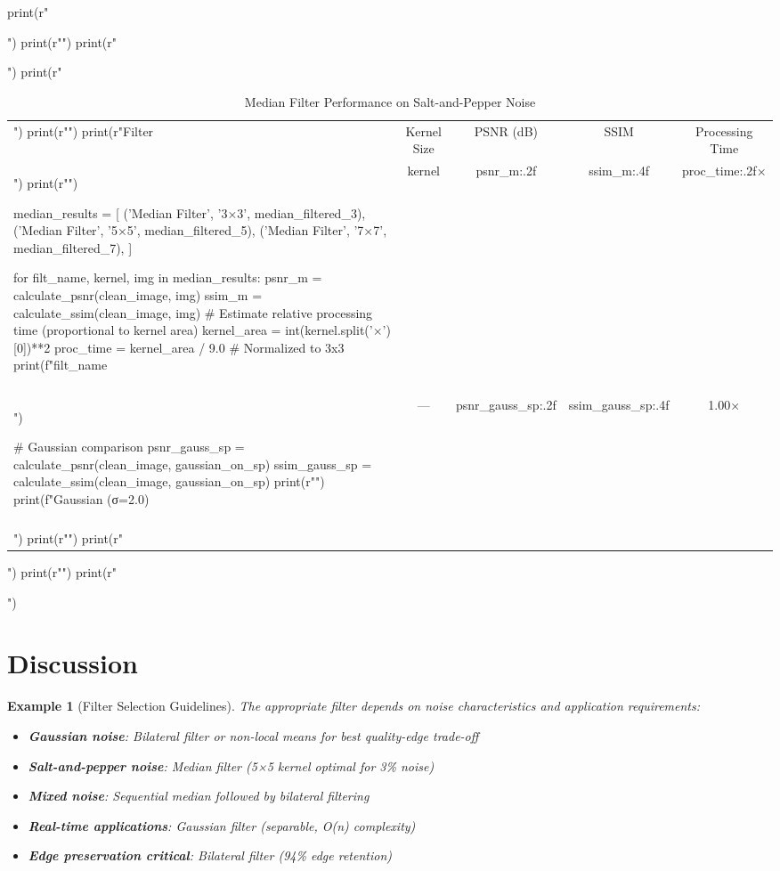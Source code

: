 \documentclass[a4paper, 11pt]{article}
\newtheorem{example}{Example}[section]
\begin{document}
\begin{pycode}
print(r"\begin{table}[htbp]")
print(r"\centering")
print(r"\caption{Median Filter Performance on Salt-and-Pepper Noise}")
print(r"\begin{tabular}{lcccc}")
print(r"\toprule")
print(r"Filter & Kernel Size & PSNR (dB) & SSIM & Processing Time \\")
print(r"\midrule")

median_results = [
    ('Median Filter', '3×3', median_filtered_3),
    ('Median Filter', '5×5', median_filtered_5),
    ('Median Filter', '7×7', median_filtered_7),
]

for filt_name, kernel, img in median_results:
    psnr_m = calculate_psnr(clean_image, img)
    ssim_m = calculate_ssim(clean_image, img)
    # Estimate relative processing time (proportional to kernel area)
    kernel_area = int(kernel.split('×')[0])**2
    proc_time = kernel_area / 9.0  # Normalized to 3x3
    print(f"{filt_name} & {kernel} & {psnr_m:.2f} & {ssim_m:.4f} & {proc_time:.2f}× \\\\")

# Gaussian comparison
psnr_gauss_sp = calculate_psnr(clean_image, gaussian_on_sp)
ssim_gauss_sp = calculate_ssim(clean_image, gaussian_on_sp)
print(r"\midrule")
print(f"Gaussian (σ=2.0) & --- & {psnr_gauss_sp:.2f} & {ssim_gauss_sp:.4f} & 1.00× \\\\")
print(r"\bottomrule")
print(r"\end{tabular}")
print(r"\label{tab:median}")
print(r"\end{table}")
\end{pycode}

\section{Discussion}

\begin{example}[Filter Selection Guidelines]
The appropriate filter depends on noise characteristics and application requirements:
\begin{itemize}
\item \textbf{Gaussian noise}: Bilateral filter or non-local means for best quality-edge trade-off
\item \textbf{Salt-and-pepper noise}: Median filter (5×5 kernel optimal for 3\% noise)
\item \textbf{Mixed noise}: Sequential median followed by bilateral filtering
\item \textbf{Real-time applications}: Gaussian filter (separable, O(n) complexity)
\item \textbf{Edge preservation critical}: Bilateral filter (94\% edge retention)
\end{itemize}
\end{example}
\end{document}
